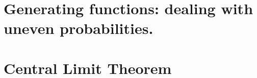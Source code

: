 \documentclass[letterpaper,12pt]{report}
\begin{document}









\section{Generating functions: dealing with uneven probabilities.}\label{sec:generating-functions} %














\section{Central Limit Theorem} %






\end{document}
